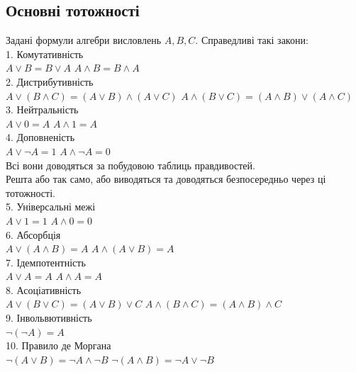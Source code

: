 \documentclass[a4paper, 14pt]{extarticle}
\theoremstyle{theoremdd}
\theoremstyle{theoremdd}
\theoremstyle{theoremdd}
\theoremstyle{theoremdd}
\theoremstyle{theoremdd}
\theoremstyle{theoremdd}
\theoremstyle{theoremdd}
\theoremstyle{theoremdd}
\theoremstyle{theoremdd}
\theoremstyle{theoremdd}
\theoremstyle{theoremdd}
\theoremstyle{theoremdd}
\theoremstyle{theoremdd}
\theoremstyle{theoremdd}
\theoremstyle{theoremdd}
\begin{document}
\subsection{Основні тотожності}
Задані формули алгебри висловлень $A,B,C$. Справедливі такі закони:\\
1. Комутативність\\
$A \vee B = B \vee A$ \hspace{5cm} $A \wedge B = B \wedge A$\\
2. Дистрибутивність\\
$A \vee (B \wedge C) = (A \vee B) \wedge (A \vee C)$ \hspace{1cm} $A \wedge (B \vee C) = (A \wedge B) \vee (A \wedge C)$\\
3. Нейтральність\\
$A \vee 0 = A$ \hspace{6cm} $A \wedge 1 = A$\\
4. Доповненість\\
$A \vee \neg A = 1$ \hspace{5.6cm} $A \wedge \neg A = 0$\\
Всі вони доводяться за побудовою таблиць правдивостей.\\
Решта або так само, або виводяться та доводяться безпосередньо через ці тотожності.
\bigskip \\
5. Універсальні межі\\
$A \vee 1 = 1$ \hspace{6cm} $A \wedge 0 = 0$\\
6. Абсорбція\\
$A \vee (A \wedge B) = A$ \hspace{4.4cm} $A \wedge (A \vee B) = A$\\
7. Ідемпотентність\\
$A \vee A = A$ \hspace{5.7cm} $A \wedge A = A$\\
8. Асоціативність\\
$A \vee (B \vee C) = (A \vee B) \vee C$ \hspace{2cm} $A \wedge (B \wedge C) = (A \wedge B) \wedge C$\\
9. Інвольвютивність\\
$\neg (\neg A) = A$\\
10. Правило де Моргана\\
$\neg(A \vee B) = \neg A \wedge \neg B$ \hspace{3cm} $\neg(A \wedge B) = \neg A \vee \neg B$
\end{document}
